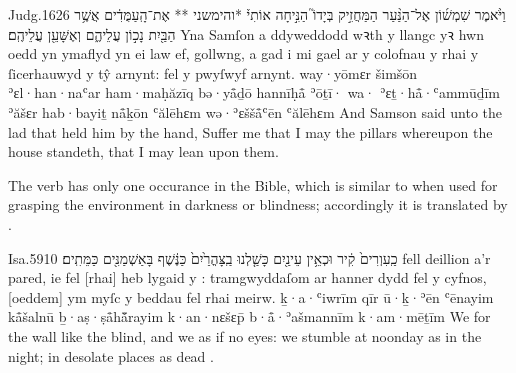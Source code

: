 \begin{example}{Judg.}{16}{26}{}{}
	\quoling
	{וַיֹּ֨אמֶר שִׁמְשׁ֜וֹן אֶל־הַנַּ֨עַר הַמַּחֲזִ֣יק בְּיָדוֹ֮ הַנִּ֣יחָה אוֹתִי֒ *והימשני ** אֶת־הָֽעַמֻּדִ֔ים אֲשֶׁ֥ר הַבַּ֖יִת נָכ֣וֹן עֲלֵיהֶ֑ם וְאֶשָּׁעֵ֖ן עֲלֵיהֶֽם׃}
	{Yna Samſon a ddyweddodd wꝛth y llangc yꝛ hwn oedd yn ymaflyd yn ei law ef, gollwng, a gad i mi gael  ar y colofnau y rhai y ſicerhauwyd y tŷ arnynt: fel y pwyſwyf arnynt.}
	{way·yōmɛr šimšōn ʾɛl·han·naʿar ham·maḥăzīq bə·yå̄ḏō hannīḥå̄ ʾōṯī· wa· ʾɛṯ·hå̄·ʿammūḏīm ʾăšɛr hab·bayiṯ nå̄ḵōn ʿălēhɛm wə·ʾɛššå̄ʿēn ʿălēhɛm}
	{And Samson said unto the lad that held him by the hand, Suffer me that I may  the pillars whereupon the house standeth, that I may lean upon them.}
\end{example}




\begin{paper}
	The verb  has only one occurance in the Bible, which is similar to  when used for grasping the environment in darkness or blindness; accordingly it is translated by .
\end{paper}

\begin{example}{Isa.}{59}{10}{}{}
	\quoling
	{ כַֽעִוְרִים֙ קִ֔יר וּכְאֵ֥ין עֵינַ֖יִם  כָּשַׁ֤לְנוּ בַֽצָּהֳרַ֙יִם֙ כַּנֶּ֔שֶׁף בָּאַשְׁמַנִּ֖ים כַּמֵּתִֽים׃}
	{ fell deillion a’r pared, ie fel [rhai] heb lygaid y  : tramgwyddaſom ar hanner dydd fel y cyfnos, [oeddem] ym myſc y beddau fel rhai meirw.}
	{ ḵ·a·ʿiwrīm qīr ū·ḵ·ʾēn ʿēnayim  kå̄šalnū ḇ·aṣ·ṣå̄hå̄̆rayim k·an·nɛšɛp̄ b·å̄·ʾašmannīm k·am·mēṯīm}
	{We  for the wall like the blind, and we  as if  no eyes: we stumble at noonday as in the night;  in desolate places as dead .}
\end{example}
